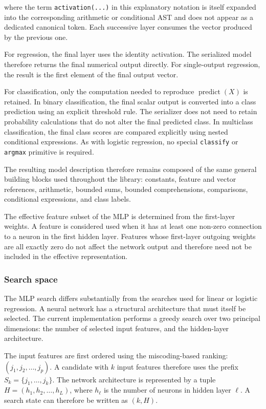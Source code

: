 where the term \texttt{activation(...)} in this explanatory notation is itself expanded into the corresponding arithmetic or conditional AST and does not appear as a dedicated canonical token. Each successive layer consumes the vector produced by the previous one.

For regression, the final layer uses the identity activation. The serialized model therefore returns the final numerical output directly. For single-output regression, the result is the first element of the final
output vector.

For classification, only the computation needed to reproduce $\operatorname{predict}(X)$ is retained. In binary classification, the final scalar output is converted into a class prediction using an explicit threshold rule. The serializer does not need to retain probability calculations that do not alter the final predicted class. In multiclass classification, the final class scores are compared explicitly using nested conditional expressions. As with logistic regression, no special \texttt{classify} or \texttt{argmax} primitive is required.

The resulting model description therefore remains composed of the same general building blocks used throughout the library: constants, feature and vector references, arithmetic, bounded sums, bounded comprehensions, comparisons, conditional expressions, and class labels.

The effective feature subset of the MLP is determined from the first-layer weights. A feature is considered used when it has at least one non-zero connection to a neuron in the first hidden layer. Features whose first-layer outgoing weights are all exactly zero do not affect the network output and therefore need not be included in the effective representation.


\subsubsection{Search space}

The MLP search differs substantially from the searches used for linear or logistic regression. A neural network has a structural architecture that must itself be selected. The current implementation performs a greedy search over two principal dimensions: the number of selected input features, and the hidden-layer architecture.

The input features are first ordered using the miscoding-based ranking: $(j_1,j_2,\ldots,j_p)$. A candidate with $k$ input features therefore uses the prefix $S_k = \{j_1,\ldots,j_k\}$. The network architecture is represented by a tuple $H = (h_1,h_2,\ldots,h_L)$, where $h_\ell$ is the number of neurons in hidden layer $\ell$. A search state can therefore be written as $(k,H)$.

